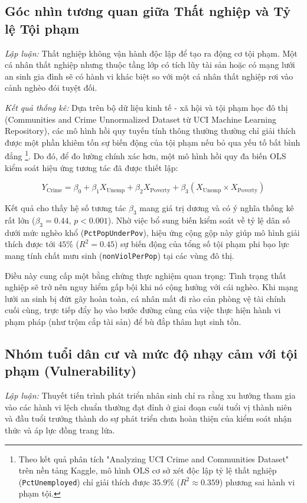 \documentclass[conference]{IEEEtran}
\begin{document}
\subsection{Góc nhìn tương quan giữa Thất nghiệp và Tỷ lệ Tội phạm}
\textit{Lập luận:} Thất nghiệp không vận hành độc lập để tạo ra động cơ tội phạm. Một cá nhân thất nghiệp nhưng thuộc tầng lớp có tích lũy tài sản hoặc có mạng lưới an sinh gia đình sẽ có hành vi khác biệt so với một cá nhân thất nghiệp rơi vào cảnh nghèo đói tuyệt đối.

\textit{Kết quả thống kê:} Dựa trên bộ dữ liệu kinh tế - xã hội và tội phạm học đô thị (Communities and Crime Unnormalized Dataset từ UCI Machine Learning Repository), các mô hình hồi quy tuyến tính thông thường thường chỉ giải thích được một phần khiêm tốn sự biến động của tội phạm nếu bỏ qua yếu tố bất bình đẳng \footnote{Theo kết quả phân tích "Analyzing UCI Crime and Communities Dataset" trên nền tảng Kaggle, mô hình OLS cơ sở xét độc lập tỷ lệ thất nghiệp (\texttt{PctUnemployed}) chỉ giải thích được $35.9\%$ ($R^2 \approx 0.359$) phương sai hành vi phạm tội.}. Do đó, để đo lường chính xác hơn, một mô hình hồi quy đa biến OLS kiểm soát hiệu ứng tương tác đã được thiết lập:

\begin{equation}
Y_{\text{Crime}} = \beta_0 + \beta_1 X_{\text{Unemp}} + \beta_2 X_{\text{Poverty}} + \beta_3 (X_{\text{Unemp}} \times X_{\text{Poverty}})
\end{equation}

Kết quả cho thấy hệ số tương tác $\beta_3$ mang giá trị dương và có ý nghĩa thống kê rất lớn ($\beta_3 = 0.44$, $p < 0.001$). Nhờ việc bổ sung biến kiểm soát về tỷ lệ dân số dưới mức nghèo khổ (\texttt{PctPopUnderPov}), hiệu ứng cộng gộp này giúp mô hình giải thích được tới $45\%$ ($R^2 = 0.45$) sự biến động của tổng số tội phạm phi bạo lực mang tính chất mưu sinh (\texttt{nonViolPerPop}) tại các vùng đô thị. 

Điều này cung cấp một bằng chứng thực nghiệm quan trọng: Tình trạng thất nghiệp sẽ trở nên nguy hiểm gấp bội khi nó cộng hưởng với cái nghèo. Khi mạng lưới an sinh bị đứt gãy hoàn toàn, cá nhân mất đi rào cản phòng vệ tài chính cuối cùng, trực tiếp đẩy họ vào bước đường cùng của việc thực hiện hành vi phạm pháp (như trộm cắp tài sản) để bù đắp thâm hụt sinh tồn.

\subsection{Nhóm tuổi dân cư và mức độ nhạy cảm với tội phạm (Vulnerability)}
\textit{Lập luận:} Thuyết tiến trình phát triển nhân sinh chỉ ra rằng xu hướng tham gia vào các hành vi lệch chuẩn thường đạt đỉnh ở giai đoạn cuối tuổi vị thành niên và đầu tuổi trưởng thành do sự phát triển chưa hoàn thiện của kiểm soát nhận thức và áp lực đồng trang lứa.
\end{document}
